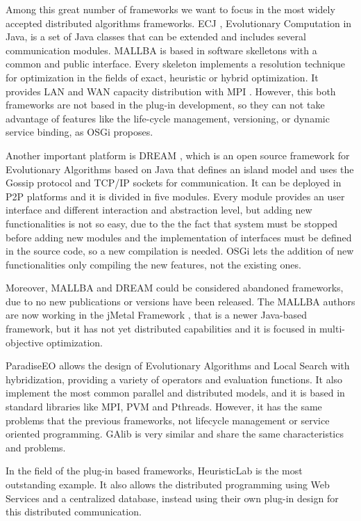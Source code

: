 \documentclass{sig-alternate}
\begin{document}
Among this great number of frameworks we want to focus in the most widely accepted distributed algorithms frameworks. ECJ \cite{luke:ejb}, Evolutionary Computation in Java, is a set of Java classes that can be extended and includes several communication modules. MALLBA \cite{MALLBA} is based in software skelletons with a common and public interface. Every skeleton implements a resolution technique for optimization in the fields of exact, heuristic or hybrid optimization. It provides LAN and WAN capacity distribution with MPI . However, this both frameworks are not based in the plug-in development, so they can not take advantage of features like the life-cycle management, versioning, or dynamic service binding, as OSGi proposes.




Another important platform is DREAM \cite{LNCSDREAM}, which is an open source framework for Evolutionary Algorithms based on Java that
defines an island model and uses the Gossip protocol and TCP/IP sockets for
communication. It can be deployed in P2P platforms and it is divided
in five modules. Every module provides an user interface and different
interaction and abstraction level, but adding new functionalities is not so easy, due to the the fact that system must be stopped before adding new modules and the implementation of interfaces must be defined in the source code, so a new compilation is needed. OSGi lets the addition of new functionalities only compiling the new features, not the existing ones. 

Moreover, MALLBA and DREAM could be considered abandoned frameworks, due to no new publications or versions have been released. The MALLBA authors are now working in the jMetal Framework \cite{JMETAL}, that is a newer Java-based framework, but it has not yet distributed capabilities and it is focused in multi-objective optimization.

ParadiseEO \cite{PARADISE} allows the design of Evolutionary Algorithms and Local Search with hybridization, providing a variety of operators and evaluation functions. It also implement the most common parallel and distributed models, and it is based in standard libraries like MPI, PVM and Pthreads. However, it has the same problems that the previous frameworks, not lifecycle management or service oriented programming. GAlib \cite{GALIB} is very similar and share the same characteristics and problems.

In the field of the plug-in based frameworks, HeuristicLab \cite{HEURISTICLAB} is the most outstanding example. It also allows the distributed programming using Web Services and a centralized database, instead using their own plug-in design for this distributed communication. 
\end{document}
